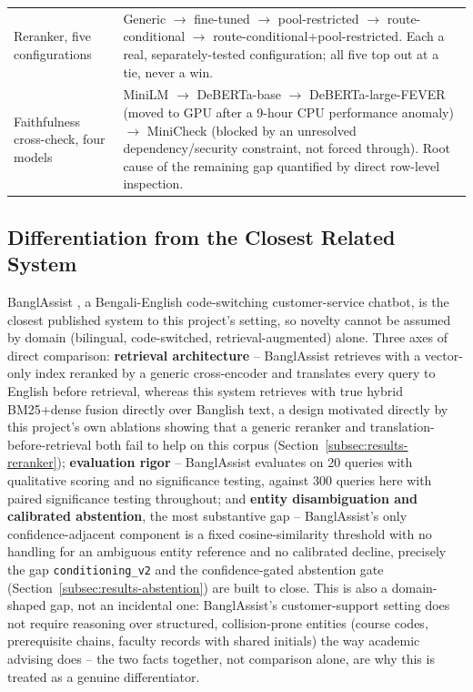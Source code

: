 \documentclass[a4paper,twoside]{article}
\begin{document}
\begin{table}[h]
\begin{tabular}{|p{3.1cm}|p{7.6cm}|}
Reranker, five configurations & Generic $\to$ fine-tuned $\to$ pool-restricted $\to$ route-conditional $\to$ route-conditional+pool-restricted. Each a real, separately-tested configuration; all five top out at a tie, never a win. \\
Faithfulness cross-check, four models & MiniLM $\to$ DeBERTa-base $\to$ DeBERTa-large-FEVER (moved to GPU after a 9-hour CPU performance anomaly) $\to$ MiniCheck (blocked by an unresolved dependency/security constraint, not forced through). Root cause of the remaining gap quantified by direct row-level inspection. \\
\hline
\end{tabular}
\end{table}

\subsection{Differentiation from the Closest Related System}
\label{subsec:differentiation}

BanglAssist \citep{kruk2025banglassist}, a Bengali-English code-switching customer-service chatbot, is the closest published system to this project's setting, so novelty cannot be assumed by domain (bilingual, code-switched, retrieval-augmented) alone. Three axes of direct comparison: \textbf{retrieval architecture} -- BanglAssist retrieves with a vector-only index reranked by a generic cross-encoder and translates every query to English before retrieval, whereas this system retrieves with true hybrid BM25+dense fusion directly over Banglish text, a design motivated directly by this project's own ablations showing that a generic reranker and translation-before-retrieval both fail to help on this corpus (Section~\ref{subsec:results-reranker}); \textbf{evaluation rigor} -- BanglAssist evaluates on 20 queries with qualitative scoring and no significance testing, against 300 queries here with paired significance testing throughout; and \textbf{entity disambiguation and calibrated abstention}, the most substantive gap -- BanglAssist's only confidence-adjacent component is a fixed cosine-similarity threshold with no handling for an ambiguous entity reference and no calibrated decline, precisely the gap \texttt{conditioning\_v2} and the confidence-gated abstention gate (Section~\ref{subsec:results-abstention}) are built to close. This is also a domain-shaped gap, not an incidental one: BanglAssist's customer-support setting does not require reasoning over structured, collision-prone entities (course codes, prerequisite chains, faculty records with shared initials) the way academic advising does -- the two facts together, not comparison alone, are why this is treated as a genuine differentiator.
\end{document}
